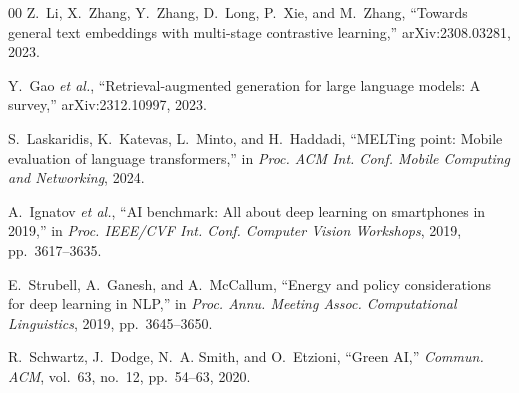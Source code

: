 \documentclass[conference]{IEEEtran}
\begin{document}
\begin{thebibliography}{00}
Z.~Li, X.~Zhang, Y.~Zhang, D.~Long, P.~Xie, and M.~Zhang, ``Towards general
text embeddings with multi-stage contrastive learning,'' arXiv:2308.03281,
2023.

Y.~Gao \emph{et al.}, ``Retrieval-augmented generation for large language
models: A survey,'' arXiv:2312.10997, 2023.

S.~Laskaridis, K.~Katevas, L.~Minto, and H.~Haddadi, ``MELTing point: Mobile
evaluation of language transformers,'' in \emph{Proc. ACM Int. Conf. Mobile
Computing and Networking}, 2024.

A.~Ignatov \emph{et al.}, ``AI benchmark: All about deep learning on smartphones
in 2019,'' in \emph{Proc. IEEE/CVF Int. Conf. Computer Vision Workshops},
2019, pp.~3617--3635.

E.~Strubell, A.~Ganesh, and A.~McCallum, ``Energy and policy considerations for
deep learning in NLP,'' in \emph{Proc. Annu. Meeting Assoc. Computational
Linguistics}, 2019, pp.~3645--3650.

R.~Schwartz, J.~Dodge, N.~A. Smith, and O.~Etzioni, ``Green AI,''
\emph{Commun. ACM}, vol.~63, no.~12, pp.~54--63, 2020.

\end{thebibliography}

\balance
\end{document}
